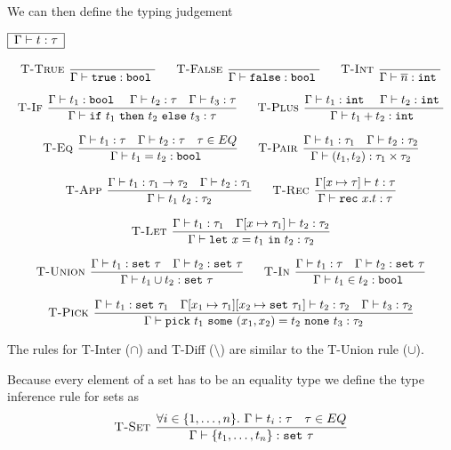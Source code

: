 \documentclass[a4paper]{article}
\newcommand{\s}[1]{\mathtt{#1}}
\newcommand{\sn}{\overline{n}}
\newcommand{\sLb}{\s{\{}}
\newcommand{\sRb}{\s{\}}}
\newcommand{\sbool}{\s{bool\ }}
\newcommand{\sint}{\s{int\ }}
\newcommand{\sseta}{\s{set\ }}
\newcommand{\sif}{\s{if\ }}
\newcommand{\sthen}{\s{\ then\ }}
\newcommand{\selse}{\s{\ else\ }}
\newcommand{\spick}[3]{\s{pick}\ #1\ \s{some}\ #2\ \s{none}\ #3}
\newcommand{\sletin}[2]{\s{let\ } #1 \s{\ in\ } #2}
\newcommand{\srec}{\s{rec\ }}
\newcommand{\strue}{\s{true}}
\newcommand{\sfalse}{\s{false}}
\newcommand{\sset}[1]{\sLb #1 \sRb}
\newcommand{\dotset}[2]{\{#1,\ldots,#2\}}
\renewcommand{\rule}[3][]{\ \mbox{\textsc{#1 }}\dfrac{#2}{#3}\ }
\newcommand{\smbox}[1]{
  $\begin{array}{|c|}
    \hline
    #1 \\
    \hline
  \end{array}$
}
\begin{document}
We can then define the typing judgement
\smbox{\Gamma \vdash t : \tau}
\[\begin{array}{c}
\rule[T-True]{}{\Gamma \vdash \strue : \sbool}\quad
\rule[T-False]{}{\Gamma \vdash \sfalse : \sbool}\quad
\rule[T-Int]{}{\Gamma \vdash \sn : \sint}
\\\\
\rule[T-If]{\Gamma\vdash t_1 : \sbool \quad \Gamma\vdash t_2 : \tau \quad \Gamma\vdash t_3 : \tau}{\Gamma\vdash \sif t_1 \sthen t_2 \selse t_3 : \tau}\quad
\rule[T-Plus]{\Gamma\vdash t_1 : \sint \quad \Gamma\vdash t_2 : \sint}{\Gamma\vdash t_1 + t_2 : \sint}\\\\
\rule[T-Eq]{\Gamma\vdash t_1 : \tau \quad \Gamma\vdash t_2 : \tau
\quad \tau \in EQ}
{\Gamma\vdash t_1 = t_2 : \sbool}\quad
\rule[T-Pair]{\Gamma\vdash t_1 : \tau_1
\quad \Gamma \vdash t_2 : \tau_2}
{\Gamma \vdash (t_1, t_2) : \tau_1 \times \tau_2}
\\\\
\rule[T-App]{\Gamma\vdash t_1 : \tau_1 \to \tau_2 \quad \Gamma \vdash t_2 : \tau_1}{\Gamma \vdash t_1\ t_2 : \tau_2}\quad
\rule[T-Rec]{\Gamma[x \mapsto \tau] \vdash t : \tau}
{\Gamma\vdash \srec x. t : \tau}
\\\\
\rule[T-Let]{\Gamma \vdash t_1 : \tau_1
\quad \Gamma[x \mapsto \tau_1] \vdash t_2 : \tau_2}
{\Gamma\vdash \sletin{x = t_1}{t_2} : \tau_2}
\\\\
\rule[T-Union]{\Gamma\vdash t_1 : \s{set}\ \tau
\quad \Gamma \vdash t_2 : \s{set}\ \tau}
{\Gamma \vdash t_1 \cup t_2 : \s{set}\ \tau}
\quad
\rule[T-In]{\Gamma\vdash t_1 : \tau
\quad \Gamma \vdash t_2 : \s{set}\ \tau}
{\Gamma \vdash t_1 \in t_2 : \sbool}
\\\\
\rule[T-Pick]{\Gamma \vdash t_1 : \s{set}\ \tau_1
\quad \Gamma[x_1 \mapsto \tau_1][x_2 \mapsto \s{set}\ \tau_1]
\vdash t_2 : \tau_2
\quad \Gamma \vdash t_3 : \tau_2}
{\Gamma\vdash \spick{t_1}{(x_1,x_2) = t_2}{t_3} : \tau_2}
\end{array}
\]

The rules for T-Inter ($\cap$) and T-Diff ($\setminus$) are similar
to the T-Union rule ($\cup$).

Because every element of a set has to be an equality type we define the type inference rule for sets as
\[
\rule[T-Set]{\forall i\in \dotset{1}{n}.\ \Gamma\vdash t_i : \tau \quad \tau \in EQ}{\Gamma\vdash\sset{t_1,\ldots,t_n} : \sseta \tau}
\]
\end{document}
